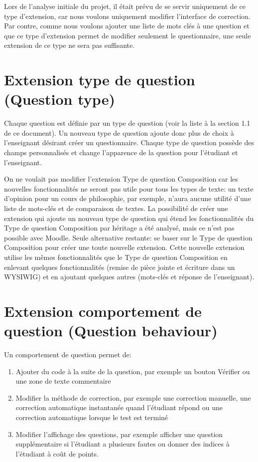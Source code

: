 Lors de l'analyse initiale du projet, il était prévu de se servir uniquement de ce type d'extension, car nous voulons uniquement modifier l'interface de correction. Par contre, comme nous voulons ajouter une liste de mots clés à une question et que ce type d'extension permet de modifier seulement le questionnaire, une seule extension de ce type ne sera pas suffisante.

\section{Extension type de question (Question type)}

Chaque question est définie par un type de question (voir la liste à la section 1.1 de ce document). Un nouveau type de question ajoute donc plus de choix à l'enseignant désirant créer un questionnaire. Chaque type de question possède des champs personnalisés et change l'apparence de la question pour l'étudiant et l'enseignant.

On ne voulait pas modifier l'extension \og Type de question Composition \fg{} car les nouvelles fonctionnalités ne seront pas utile pour tous les types de texte: un texte d'opinion pour un cours de philosophie, par exemple, n'aura aucune utilité d'une liste de mots-clés et de comparaison de textes. La possibilité de créer une extension qui ajoute un nouveau type de question qui étend les fonctionnalités du \og Type de question Composition \fg{} par héritage a été analysé, mais ce n'est pas possible avec Moodle. Seule alternative restante: se baser sur le \og Type de question Composition \fg{} pour créer une toute nouvelle extension. Cette nouvelle extension utilise les mêmes fonctionnalités que le \og Type de question Composition \fg{} en enlevant quelques fonctionnalités (remise de pièce jointe et écriture dans un WYSIWIG) et en ajoutant quelques autres (mots-clés et réponse de l'enseignant).

\section{Extension comportement de question (Question behaviour)}

Un comportement de question permet de:
\begin{enumerate}
  \item Ajouter du code à la suite de la question, par exemple un bouton \og Vérifier \fg{} ou une zone de texte commentaire
  \item Modifier la méthode de correction, par exemple une correction manuelle, une correction automatique instantanée quand l'étudiant répond ou une correction automatique lorsque le test est terminé
  \item Modifier l'affichage des questions, par exemple afficher une question supplémentaire si l'étudiant a plusieurs fautes ou donner des indices à l'étudiant à coût de points.
\end{enumerate}

